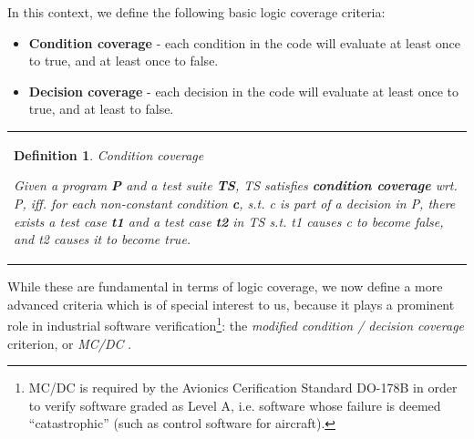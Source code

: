 \documentclass{article}
\newcommand{\tmem}[1]{{\em #1\/}}
\newcommand{\tmstrong}[1]{\textbf{#1}}
\newenvironment{itemizedot}{\begin{itemize} \renewcommand{\labelitemi}{$\bullet$}\renewcommand{\labelitemii}{$\bullet$}\renewcommand{\labelitemiii}{$\bullet$}\renewcommand{\labelitemiv}{$\bullet$}}{\end{itemize}}
\newenvironment{tmparmod}[3]{\begin{list}{}{\setlength{\topsep}{0pt}\setlength{\leftmargin}{#1}\setlength{\rightmargin}{#2}\setlength{\parindent}{#3}\setlength{\listparindent}{\parindent}\setlength{\itemindent}{\parindent}\setlength{\parsep}{\parskip}} \item[]}{\end{list}}
\newtheorem{definition}{Definition}
{\theorembodyfont{\rmfamily}\newtheorem{example}{Example}}
\begin{document}
In this context, we define the following basic logic coverage criteria:
\begin{itemizedot}
  \item {\tmstrong{Condition coverage}} - each condition in the code will
  evaluate at least once to true, and at least once to false.
  
  \item {\tmstrong{Decision coverage }}- each decision in the code will
  evaluate at least once to true, and at least to false.
\end{itemizedot}


\begin{tmparmod}{1cm}{0pt}{0pt}
  \begin{tmparmod}{0pt}{1cm}{0pt}
    {\noindent}{\noindent}\begin{tabular}{l}
      \begin{definition}
        Condition coverage
        
        
        
        Given a program {\tmem{{\tmstrong{P{\tmstrong{}}}}}} and a test suite
        {\tmem{{\tmstrong{TS}}{\tmstrong{}}}}, TS satisfies
        {\tmstrong{condition coverage}} wrt. P, iff. for each non-constant
        condition {\tmem{{\tmstrong{c}}}}, s.t. c is part of a decision in P,
        there exists a test case {\tmem{{\tmstrong{t1}}}} and a test case
        {\tmem{{\tmstrong{t2}}}} in TS s.t. t1 causes c to become false, and
        t2 causes it to become true. 
      \end{definition}
    \end{tabular}{\hspace*{\fill}}{\smallskip}
  \end{tmparmod}
\end{tmparmod}





While these are fundamental in terms of logic coverage, we now define a more
advanced criteria which is of special interest to us, because it plays a
prominent role in industrial software verification{\footnote{MC/DC is required
by the Avionics Cerification Standard DO-178B in order to verify software
graded as Level A, i.e. software whose failure is deemed ``catastrophic''
(such as control software for aircraft).}}: the {\tmem{modified condition /
decision coverage}} criterion, or {\tmem{MC/DC}}
{\cite{hayhurst2001practical}}{\cite{chilenski2001investigation}}.
\end{document}
